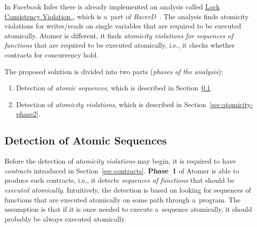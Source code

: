 \documentclass{ExcelAtFIT}
\begin{document}
In Facebook Infer there is already implemented
an analysis called
\href{https://fbinfer.com/docs/checkers-bug-types.html\#LOCK_CONSISTENCY_VIOLATION}{
    Lock Consistency Violation
},
which is a~part of \emph{RacerD}~\cite{racerd}.
The analysis finds atomicity violations
for writes/reads on single variables that are
required to be executed atomically. Atomer is
different, it finds \emph{atomicity
violations for sequences of functions} that are
required to be executed atomically, i.e., it
checks whether contracts for concurrency hold.

The proposed solution is divided into two parts
(\emph{phases of the analysis}):
\begin{enumerate}[
    label={\textbf{Phase \arabic*}},
    leftmargin=1.5cm,
    topsep=0.4em
]
    \item
        Detection of \emph{atomic sequences},
        which is described in
        Section~\ref{sec:atomicity-phase1}.

    \item
        Detection of \emph{atomicity violations},
        which is described in
        Section~\ref{sec:atomicity-phase2}.
\end{enumerate}

\subsection{Detection of Atomic Sequences}
\label{sec:atomicity-phase1}

Before the detection of \emph{atomicity
violations} may begin, it is required to have
\emph{contracts} introduced in
Section~\ref{sec:contracts}. \textbf{Phase~1}
of Atomer is able to produce such contracts,
i.e., it detects \emph{sequences of functions}
that should be \emph{executed atomically}.
Intuitively, the detection is based on
looking for sequences of functions that are
executed atomically on some path through
a~program. The assumption is that if it is
once needed to execute a~sequence atomically,
it should probably be always executed atomically.
\end{document}

